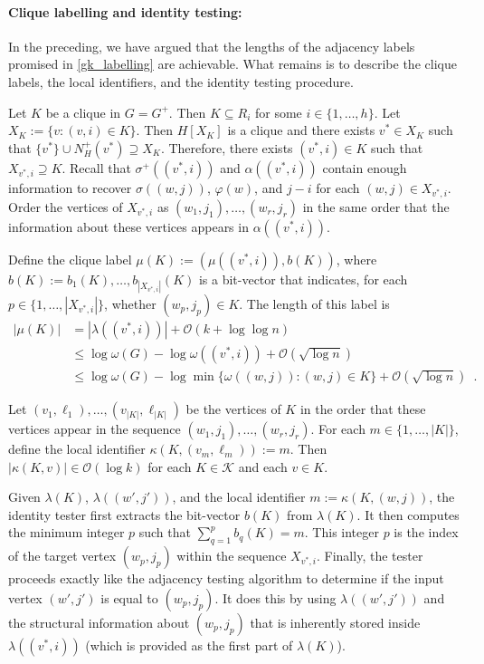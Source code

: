 \documentclass{patmorin}
\renewcommand{\le}{\leqslant}
\newcommand{\Oh}{\calO}
\newcommand{\calK}{\mathcal{K}}
\newcommand{\calO}{\mathcal{O}}
\begin{document}
  \paragraph{Clique labelling and identity testing:}
  In the preceding, we have argued that the lengths of the adjacency labels promised in \cref{gk_labelling} are achievable.
  What remains is to describe the clique labels, the local identifiers, and the identity testing procedure.

  Let $K$ be a clique in $G=G^+$.  Then $K\subseteq R_i$ for some $i\in\{1,\ldots,h\}$.  Let $X_K:=\{v: (v,i)\in K\}$.
  Then $H[X_K]$ is a clique and there exists $v^*\in X_K$ such that $\{v^*\}\cup N^+_H(v^*)\supseteq X_K$.
  Therefore, there exists $(v^*,i)\in K$ such that $X_{v^*,i}\supseteq K$. Recall that $\sigma^+((v^*,i))$ and $\alpha((v^*,i))$ contain enough information to recover $\sigma((w,j))$, $\varphi(w)$, and $j-i$ for each $(w,j)\in X_{v^*,i}$.
  Order the vertices of $X_{v^*,i}$ as $(w_1,j_1),\ldots,(w_{r},j_r)$ in the same order that the information about these vertices appears in $\alpha((v^*,i))$.

  Define the clique label $\mu(K):=(\mu((v^*,i)), b(K))$, where $b(K):=b_1(K),\ldots,b_{|X_{v^*,i}|}(K)$ is a bit-vector that indicates, for each $p\in\{1,\ldots,|X_{v^*,i}|\}$, whether $(w_p,j_p)\in K$.
  The length of this label is
  \begin{align*}
     |\mu(K)|
     & = |\lambda((v^*,i))| + \Oh(k + \log\log n) \\
     & \le \log\omega(G) - \log\omega((v^*,i)) + \Oh(\sqrt{\log n}) \\
     & \le \log\omega(G) - \log\min\{\omega((w,j)):(w,j)\in K\} + \Oh(\sqrt{\log n})  \enspace .
  \end{align*}

  Let $(v_1,\ell_1),\ldots,(v_{|K|},\ell_{|K|})$ be the vertices of $K$ in the order that these vertices appear in the sequence $(w_1,j_1),\ldots,(w_{r},j_r)$.
  For each $m\in\{1,\ldots,|K|\}$, define the local identifier $\kappa(K,(v_m,\ell_m)):= m$.  Then $|\kappa(K,v)|\in \Oh(\log k)$ for each $K\in\calK$ and each $v\in K$.

  Given $\lambda(K)$, $\lambda((w',j'))$, and the local identifier $m := \kappa(K,(w,j))$, the identity tester first extracts the bit-vector $b(K)$ from $\lambda(K)$.
  It then computes the minimum integer $p$ such that $\sum_{q=1}^p b_q(K)=m$.
  This integer $p$ is the index of the target vertex $(w_p, j_p)$ within the sequence $X_{v^*,i}$.
  Finally, the tester proceeds exactly like the adjacency testing algorithm to determine if the input vertex $(w',j')$ is equal to $(w_p,j_p)$. It does this by using $\lambda((w',j'))$ and the structural information about $(w_p,j_p)$ that is inherently stored inside $\lambda((v^*,i))$ (which is provided as the first part of $\lambda(K)$).
\end{document}

